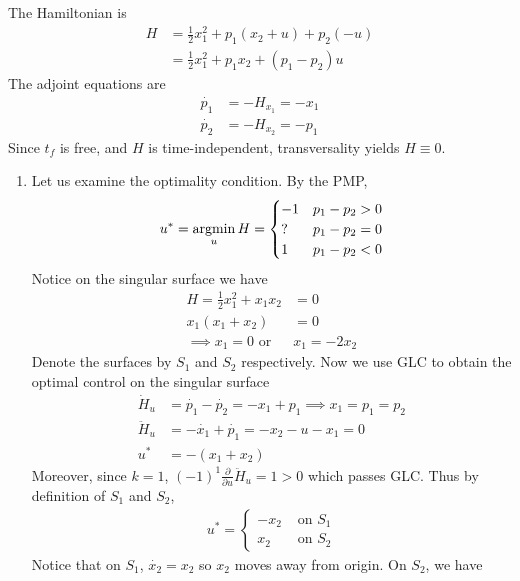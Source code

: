 \documentclass[12pt]{article}
\begin{document}
\begin{problem}[2]
The Hamiltonian is
\begin{align*}
	H &= \frac{1}{2} x_1^2 + p_1(x_2+u) + p_2(-u)\\
	&= \frac{1}{2}x_1^2+p_1x_2 +(p_1-p_2)u 
\end{align*}
The adjoint equations are
\begin{align*}
	\dot{p_1} &= -H_{x_1} = -x_1 \\
	\dot{p_2} &= -H_{x_2} = -p_1
\end{align*}
Since $ t_f$ is free, and  $ H$ is time-independent, transversality yields  $ H \equiv 0$. 

\begin{enumerate}[label=(\alph*)]
\item Let us examine the optimality condition. By the PMP,
\begin{align*}
	u^*  = \operatorname*{argmin}_u H = \begin{cases}
		-1 & p_1 - p_2 >0\\
		? & p_1 - p_2 =0\\
		1 & p_1 - p_2 <0
	\end{cases}
\end{align*}
Notice on the singular surface we have
\begin{align*}
	H = \frac{1}{2} x_1^2+x_1 x_2 &= 0 \\
	x_1(x_1+x_2) &= 0\\
	\implies x_1 =0 \text{ or } & x_1 = -2 x_2 
\end{align*}
Denote the surfaces by $ S_1$ and $ S_2$ respectively. Now we use GLC to obtain the optimal control on the singular surface
\begin{align*}
	\dot{H}_u &= \dot{p_1} - \dot{p_2} = -x_1 + p_1 \implies x_1 = p_1 = p_2 \\
	\ddot{H}_u &= -\dot{x_1} + \dot{p_1} = -x_2 - u - x_1 =0 \\
	u^* &= -(x_1 + x_2) 
\end{align*}
Moreover, since $ k=1$, $ (-1)^{1 } \frac{\partial }{\partial u} \ddot{H}_u = 1 >0 $ which passes GLC. Thus by definition of $ S_1$ and $S_2$,
\begin{align*}
	u^* = \begin{cases}
		-x_2 & \text{ on } S_1\\
		x_2 & \text{ on } S_2
	\end{cases}
\end{align*}
Notice that on $ S_1$, $ \dot{x_2} = x_2$ so $ x_2$ moves away from origin. On $ S_2$, we have
\begin{align*}

\end{align*}
\end{enumerate}
\end{problem}
\end{document}
